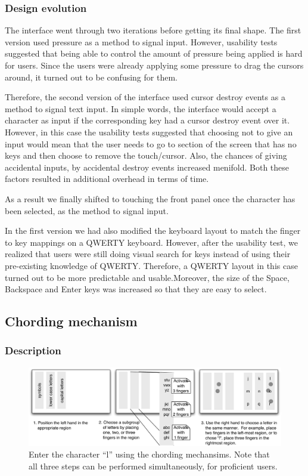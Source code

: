 \subsubsection{Design evolution}

The interface went through two iterations before getting its final
shape. The first version used pressure as a method to signal
input. However, usability tests suggested that being able to control
the amount of pressure being applied is hard for users. Since the
users were already applying some pressure to drag the cursors around,
it turned out to be confusing for them.

Therefore, the second version of the interface used cursor destroy
events as a method to signal text input. In simple words, the
interface would accept a character as input if the corresponding key
had a cursor destroy event over it. However, in this case the
usability tests suggested that choosing not to give an input would
mean that the user needs to go to section of the screen that has no
keys and then choose to remove the touch/cursor. Also, the chances of
giving accidental inputs, by accidental destroy events increased
menifold. Both these factors resulted in additional overhead in terms
of time.

As a result we finally shifted to touching the front panel once the
character has been selected, as the method to signal input.

In the first version we had also modified the keyboard layout to match
the finger to key mappings on a QWERTY keyboard. However,
after the usability test, we realized that users were still doing
visual search for keys instead of using their pre-existing knowledge
of QWERTY. Therefore, a QWERTY layout in this case turned out to be
more predictable and usable.Moreover, the size of the Space, Backspace
and Enter keys was increased so that they are easy to select.

\subsection{Chording mechanism}
\subsubsection{Description}

\begin{figure}
    \includegraphics[width=\textwidth]{Figures/chording_explaination.pdf} 
    \caption{Enter the character ``l'' using the chording mechansims.
      Note that all three steps can be performed simultaneously, for
      proficient users.}
    \label{fig:chording_explaination}
\end{figure} 

